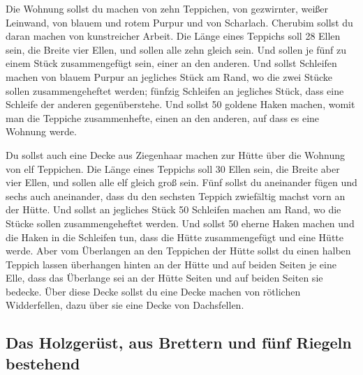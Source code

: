  Die Wohnung sollst du machen von zehn Teppichen, von
gezwirnter, weißer Leinwand, von blauem und rotem Purpur und von
Scharlach. Cherubim sollst du daran machen von kunstreicher Arbeit.
 Die Länge eines Teppichs soll 28 Ellen sein, die Breite
vier Ellen, und sollen alle zehn gleich sein.  Und sollen
je fünf zu einem Stück zusammengefügt sein, einer an den anderen.
 Und sollst Schleifen machen von blauem Purpur an
jegliches Stück am Rand, wo die zwei Stücke sollen zusammengeheftet
werden;  fünfzig Schleifen an jegliches Stück, dass eine
Schleife der anderen gegenüberstehe.  Und sollst 50
goldene Haken machen, womit man die Teppiche zusammenhefte, einen an den
anderen, auf dass es eine Wohnung werde.

 Du sollst auch eine Decke aus Ziegenhaar machen zur Hütte
über die Wohnung von elf Teppichen.  Die Länge eines
Teppichs soll 30 Ellen sein, die Breite aber vier Ellen, und sollen alle
elf gleich groß sein.  Fünf sollst du aneinander fügen und
sechs auch aneinander, dass du den sechsten Teppich zwiefältig machst
vorn an der Hütte.  Und sollst an jegliches Stück 50
Schleifen machen am Rand, wo die Stücke sollen zusammengeheftet werden.
 Und sollst 50 eherne Haken machen und die Haken in die
Schleifen tun, dass die Hütte zusammengefügt und eine Hütte werde.
 Aber vom Überlangen an den Teppichen der Hütte sollst du
einen halben Teppich lassen überhangen hinten an der Hütte
 und auf beiden Seiten je eine Elle, dass das Überlange
sei an der Hütte Seiten und auf beiden Seiten sie bedecke.
 Über diese Decke sollst du eine Decke machen von
rötlichen Widderfellen, dazu über sie eine Decke von Dachsfellen.

\hypertarget{das-holzgeruxfcst-aus-brettern-und-fuxfcnf-riegeln-bestehend}{%
\subsection{Das Holzgerüst, aus Brettern und fünf Riegeln
bestehend}\label{das-holzgeruxfcst-aus-brettern-und-fuxfcnf-riegeln-bestehend}}


